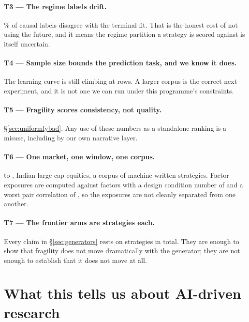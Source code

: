\documentclass[11pt,a4paper]{article}
\begin{document}
\paragraph{T3 --- The regime labels drift.} \rsRegimeTerminalDisagreement\% of causal labels
disagree with the terminal fit. That is the honest cost of not using the future, and it means the
regime partition a strategy is scored against is itself uncertain.

\paragraph{T4 --- Sample size bounds the prediction task, and we know it does.} The learning curve
is still climbing at \rsCurveSizeAtHundred{} rows. A larger corpus is the correct next experiment,
and it is not one we can run under this programme's constraints.

\paragraph{T5 --- Fragility scores consistency, not quality.} \S\ref{sec:uniformlybad}. Any use of
these numbers as a standalone ranking is a misuse, including by our own narrative layer.

\paragraph{T6 --- One market, one window, one corpus.} \rsCrrWindowStart{} to
\rsCrrWindowEnd{}, Indian large-cap equities, a corpus of machine-written strategies. Factor
exposures are computed against \rsFactorCount{} factors with a design condition number of
\rsFactorCondition{} and a worst pair correlation of \rsFactorWorstPair{}, so the exposures are not
cleanly separated from one another.

\paragraph{T7 --- The frontier arms are \rsGvGptN{} strategies each.} Every claim in
\S\ref{sec:generators} rests on \rsGvTotal{} strategies in total. They are enough to show that
fragility does not move dramatically with the generator; they are not enough to establish that it
does not move at all.

\section{What this tells us about AI-driven research}
\label{sec:meaning}
\end{document}
